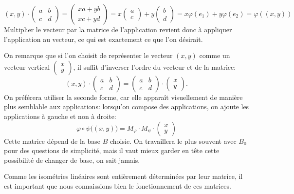 \documentclass{book}
\numberwithin{equation}{section}
\renewcommand{\phi}{\varphi}
\begin{document}
\begin{equation*}
	(x, y) \cdot \begin{pmatrix}
	a & b\\
	c & d
	\end{pmatrix}
	= \begin{pmatrix}
		xa + yb\\
		xc + yd
	\end{pmatrix}
	= x\begin{pmatrix} a\\c \end{pmatrix} + y\begin{pmatrix} b\\d \end{pmatrix}
	= x\phi(e_1) + y\phi(e_2)
	= \phi((x, y))
\end{equation*}
Multiplier le vecteur par la matrice de l'application revient donc à appliquer l'application au vecteur, ce qui est exactement ce que l'on désirait.\par
On remarque que si l'on choisit de représenter le vecteur $(x, y)$ comme un vecteur vertical $\left(\begin{smallmatrix} x\\y \end{smallmatrix}\right)$, il suffit d'inverser l'ordre du vecteur et de la matrice:	\begin{equation*}
	(x, y) \cdot \begin{pmatrix}
		a & b\\
		c & d
	\end{pmatrix}
	= \begin{pmatrix}
		a & b\\
		c & d
	\end{pmatrix} \cdot \begin{pmatrix}
		x\\y
	\end{pmatrix}.
\end{equation*}
On préférera utiliser la seconde forme, car elle apparaît visuellement de manière plus semblable aux applications: lorsqu'on compose des applications, on ajoute les applications à gauche et non à droite:
\begin{equation*}
	\phi \circ \psi\bigl((x, y)\bigr) = M_\phi \cdot M_\psi \cdot \begin{pmatrix}
		x\\y
	\end{pmatrix}
\end{equation*}
Cette matrice dépend de la base $B$ choisie. On travaillera le plus souvent avec $B_0$ pour des questions de simplicité, mais il vaut mieux garder en tête cette possibilité de changer de base, on sait jamais.\par
Comme les isométries linéaires sont entièrement déterminées par leur matrice, il est important que nous connaissions bien le fonctionnement de ces matrices.
\end{document}
